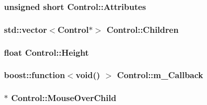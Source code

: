 \hypertarget{class_control_4cc3fdb3e18ee7a3de58185681529778}{
\subsubsection[{Attributes}]{\setlength{\rightskip}{0pt plus 5cm}unsigned short {\bf Control::Attributes}}}
\label{class_control_4cc3fdb3e18ee7a3de58185681529778}


\hypertarget{class_control_2de06adc1c35f408f8b7997324e9f8dd}{
\subsubsection[{Children}]{\setlength{\rightskip}{0pt plus 5cm}std::vector$<${\bf Control}$\ast$$>$ {\bf Control::Children}}}
\label{class_control_2de06adc1c35f408f8b7997324e9f8dd}


\hypertarget{class_control_f3d70c689cafd1dfe2313199e6a41293}{
\subsubsection[{Height}]{\setlength{\rightskip}{0pt plus 5cm}float {\bf Control::Height}}}
\label{class_control_f3d70c689cafd1dfe2313199e6a41293}


\hypertarget{class_control_8bb1b2b7c3a9c7ed2aabf992d0dbf544}{
\subsubsection[{m\_\-Callback}]{\setlength{\rightskip}{0pt plus 5cm}boost::function$<$void() $>$ {\bf Control::m\_\-Callback}}}
\label{class_control_8bb1b2b7c3a9c7ed2aabf992d0dbf544}


\hypertarget{class_control_e0c10471d5ed6637afa9bd10b828016b}{
\subsubsection[{MouseOverChild}]{$\ast$ {\bf Control::MouseOverChild}}}
\label{class_control_e0c10471d5ed6637afa9bd10b828016b}


